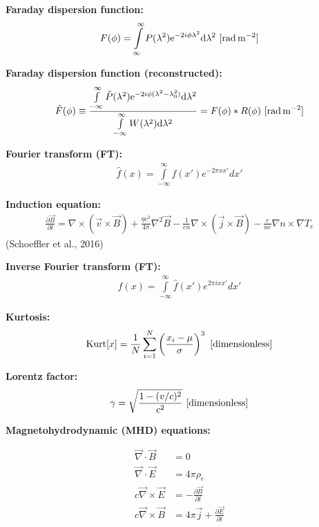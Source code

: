 \documentclass[a4paper,10pt]{article}
\begin{document}
{\noindent}\textbf{Faraday dispersion function:}
\begin{align*}
F(\phi) = \int\limits_{\infty}^\infty P(\lambda^2)\mathrm{e}^{-2i\phi\lambda^2}\mathrm{d}\lambda^2 ~ [{\rm rad\,m^{-2}}]
\end{align*}

{\noindent}\textbf{Faraday dispersion function (reconstructed):}
\begin{align*}
\tilde{F}(\phi) \equiv \dfrac{\int\limits_{-\infty}^\infty \tilde{P}(\lambda^2)\mathrm{e}^{-2i\phi(\lambda^2-\lambda_0^2)}\mathrm{d}\lambda^2}{\int\limits_{-\infty}^\infty W(\lambda^2)\mathrm{d}\lambda^2} = F(\phi) * R(\phi) ~ [{\rm rad\,m^{-2}}]
\end{align*}

{\noindent}\textbf{Fourier transform (FT):}
\begin{align*}
    \hat{f}(x) = \int\limits_{-\infty}^\infty f(x')e^{-2\pi xx'}dx'
\end{align*}

{\noindent}\textbf{Induction equation:}
\begin{align*}
    \frac{\partial\vec{B}}{\partial t} = \nabla\times(\vec{v}\times\vec{B}) + \frac{\eta c^2}{4\pi}\nabla^2\vec{B} - \frac{1}{en}\nabla\times(\vec{j}\times\vec{B}) - \frac{c}{ne}\nabla n\times\nabla T_e
\end{align*}
(Schoeffler et al., 2016)

{\noindent}\textbf{Inverse Fourier transform (FT):}
\begin{align*}
    f(x) = \int\limits_{-\infty}^\infty \hat{f}(x')e^{2\pi ixx'}dx'
\end{align*}

{\noindent}\textbf{Kurtosis:}
\begin{align*}
    {\rm Kurt}[x] = \frac{1}{N} \sum_{i=1}^N \left(\frac{x_i-\mu}{\sigma}\right)^3 ~ [{\rm dimensionless}]
\end{align*}

{\noindent}\textbf{Lorentz factor:}
\begin{align*}
    \gamma = \sqrt{\frac{1 - (v/c)^2}{c^2}} ~ [{\rm dimensionless}]
\end{align*}

{\noindent}\textbf{Magnetohydrodynamic (MHD) equations:}

\begin{align*}
    \vec\nabla\cdot\vec{B} &= 0 \\
    \vec\nabla\cdot\vec{E} &= 4\pi\rho_e \\
    c\vec\nabla\times\vec{E} &= - \frac{\partial\vec{B}}{\partial t} \\
    c\vec\nabla\times\vec{B} &= 4\pi\vec{j} + \frac{\partial\vec{E}}{\partial t}
\end{align*}
\end{document}
